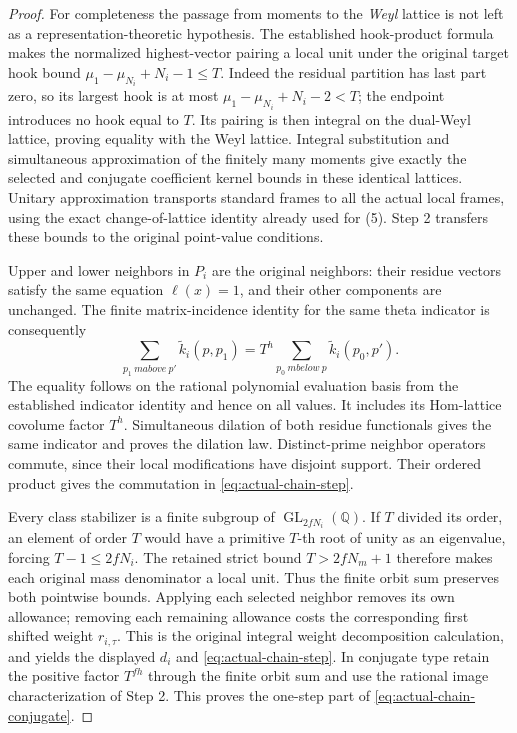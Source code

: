 \begin{proof}
For completeness the passage from moments to the \emph{Weyl}
lattice is not left as a representation-theoretic hypothesis.
The established hook-product formula makes the normalized
highest-vector pairing a local unit under the original target hook
bound $\mu_1-\mu_{N_i}+N_i-1\le T$.  Indeed the residual partition
has last part zero, so its largest hook is at most
$\mu_1-\mu_{N_i}+N_i-2<T$; the endpoint introduces no hook equal
to $T$.  Its pairing is then integral
on the dual-Weyl lattice, proving equality with the Weyl lattice.
Integral substitution and simultaneous approximation of the finitely
many moments give exactly the selected and conjugate coefficient
kernel bounds in these identical lattices.  Unitary approximation
transports standard frames to all the actual local frames, using
the exact change-of-lattice identity already used for (5).
Step 2 transfers these bounds to the original point-value conditions.

Upper and lower neighbors in $P_i$ are the original neighbors: their
residue vectors satisfy the same equation $\ell(x)=1$, and their
other components are unchanged.  The finite matrix-incidence identity
for the same theta indicator is consequently
\[
 \sum_{p_1\ {
m above}\ p'}\widetilde k_i(p,p_1)
       =T^h\sum_{p_0\ {
m below}\ p}\widetilde k_i(p_0,p').
                                                               \tag{6}
\]
The equality follows on the rational polynomial evaluation basis
from the established indicator identity and hence on all values.
It includes its Hom-lattice covolume factor $T^h$.  Simultaneous
dilation of both residue functionals gives the same indicator and
proves the dilation law.  Distinct-prime neighbor operators commute,
since their local modifications have disjoint support.  Their ordered
product gives the commutation in \eqref{eq:actual-chain-step}.

Every class stabilizer is a finite subgroup of
$\operatorname{GL}_{2fN_i}(\mathbb Q)$.  If $T$ divided its order,
an element of order $T$ would have a primitive $T$-th root of unity
as an eigenvalue, forcing $T-1\le2fN_i$.  The retained strict bound
$T>2fN_m+1$ therefore makes each original mass denominator a local
unit.  Thus the finite orbit sum preserves both pointwise bounds.
Applying each selected neighbor removes its own allowance; removing
each remaining allowance costs the corresponding first shifted
weight $r_{i,\tau}$.  This is the original integral weight decomposition
calculation, and yields the displayed $d_i$ and
\eqref{eq:actual-chain-step}.  In conjugate type retain the positive
factor $T^{fh}$ through the finite orbit sum and use the rational
image characterization of Step 2.  This proves the one-step part
of \eqref{eq:actual-chain-conjugate}.


\end{proof}
